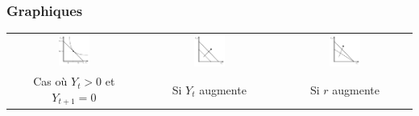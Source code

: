 \subsubsection{Graphiques}



\begin{center}
	\begin{tabular}{ccc}
		\includegraphics[width=0.25\textwidth]{images/graph_offre_de_capital_ytplus1_nulle.pdf} & \includegraphics[width=0.25\textwidth]{images/graph_offre_de_capital_ytplus1_nulle_yt_augmente.pdf} & \includegraphics[width=0.25\textwidth]{images/graph_offre_de_capital_ytplus1_nulle_r_augmente.pdf}\\
		Cas où $Y_t>0$ et $Y_{t+1}=0$             &             Si $Y_t$ augmente             &             Si $r$ augmente
	\end{tabular}
\end{center}
